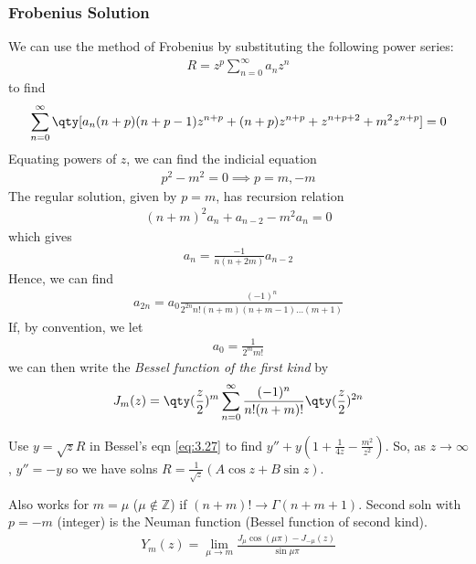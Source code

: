 \subsubsection{Frobenius Solution}
We can use the method of Frobenius by substituting the following power series:
\begin{align*}
	R = z^p \sum_{n=0}^\infty a_n z^n
\end{align*}
to find
\begin{align*}
	\sum_{n=0}^\infty \qty[ a_n (n+p)(n+p-1) z^{n+p} + (n+p) z^{n+p} + z^{n+p+2} + m^2 z^{n+p} ] = 0
\end{align*}
Equating powers of $z$, we can find the indicial equation
\begin{align*}
	p^2 - m^2 = 0 \implies p = m, -m
\end{align*}
The regular solution, given by $p = m$, has recursion relation
\begin{align*}
	(n+m)^2 a_n + a_{n-2} - m^2 a_n = 0
\end{align*}
which gives
\begin{align*}
	a_n = \frac{-1}{n(n+2m)} a_{n-2}
\end{align*}
Hence, we can find
\begin{align*}
	a_{2n} = a_0 \frac{(-1)^n}{2^{2n} n!
		(n+m)(n+m-1) \dots (m+1)}
\end{align*}
If, by convention, we let
\begin{align*}
	a_0 = \frac{1}{2^m m!}
\end{align*}
we can then write the \textit{Bessel function of the first kind} by
\begin{align} \label{eq:3.28}
	J_m(z) = \qty(\frac{z}{2})^m \sum_{n=0}^\infty \frac{(-1)^n}{n!
		(n+m)!} \qty(\frac{z}{2})^{2n}
\end{align}

\begin{exercise}
	Use $y = \sqrt{z} R$ in Bessel's eqn \cref{eq:3.27} to find $y'' + y (1 + \frac{1}{4z} - \frac{m^2}{z^2})$.
	So, as $z \to \infty$, $y'' = -y$ so we have solns $R = \frac{1}{\sqrt{z}} (A \cos z + B \sin z)$.
\end{exercise}

Also works for $m = \mu$ ($\mu \notin \mathbb{Z}$) if $(n + m)! \to \Gamma(n + m + 1)$.
Second soln with $p = -m$ (integer) is the Neuman function (Bessel function of second kind).
\begin{align*}
	Y_m(z) = \lim_{\mu \to m} \frac{J_\mu \cos(\mu \pi) - J_{-\mu}(z)}{\sin \mu \pi}
\end{align*} 

